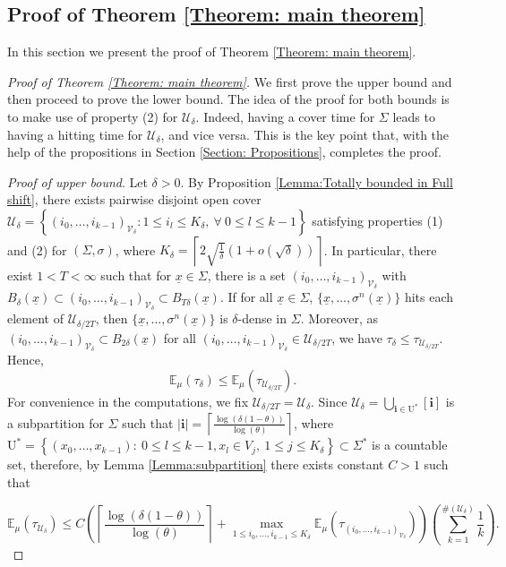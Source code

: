 \documentclass[11pt, reqno]{amsart}
\theoremstyle{plain}%
\theoremstyle{definition}
\theoremstyle{definition}
\def\U{\ensuremath{\mathcal U}}
\def\E{\mathbb E}
\def\st{such that }
\def\ulx{\underline{x}}
\numberwithin{equation}{section}
\begin{document}
\subsection{Proof of Theorem \ref{Theorem: main theorem}} In this section we present the proof of Theorem \ref{Theorem: main theorem}.
\begin{proof}[ Proof of Theorem \ref{Theorem: main theorem}] We first prove the upper bound and then proceed to prove the lower bound. The idea of the proof for both bounds is to make use of property (2) for $\U_\delta$. Indeed, having a cover time for $\Sigma$ leads to having a hitting time for $\U_\delta$, and vice versa. This is the key point that, with the help of the propositions in Section \ref{Section: Propositions}, completes the proof.


\textit{ Proof of upper bound}. Let $\delta>0$. By Proposition \ref{Lemma:Totally bounded in Full shift}, there exists pairwise disjoint open cover $\U_{\delta}=\left\{(i_0,\ldots,i_{k-1})_{\mathcal{V}_\delta}: 1\le i_l\le K_{\delta}, \ \forall \ 0\le l\le k-1 \right\}$ satisfying properties (1) and (2) for $(\Sigma,\sigma)$, where $K_{\delta}=\left\lceil2\sqrt{\frac{1}{\delta}}\left(1+o\left(\sqrt{\delta}\right)\right)\right\rceil$. In particular, there exist $1<T<\infty$ \st for $\ulx\in\Sigma$, there is a set $(i_0,\ldots,i_{k-1})_{\mathcal{V}_\delta}$ with $B_{\delta}(\ulx)\subset (i_0,\ldots,i_{k-1})_{\mathcal{V}_\delta}\subset B_{T\delta}(\ulx)$. If for all $\ulx\in \Sigma$, $\{\ulx,\ldots,\sigma^n(\ulx)\}$ hits each element of $\U_{\delta/2T}$, then $\{\ulx,\ldots,\sigma^n(\ulx)\}$ is $\delta$-dense in $\Sigma$. Moreover, as $(i_0,\ldots,i_{k-1})_{\mathcal{V}_\delta}\subset B_{2\delta}(\ulx)$ for all $(i_0,\ldots,i_{k-1})_{\mathcal{V}_\delta}\in \U_{\delta/2T}$, we have $\tau_\delta\le \tau_{\U_{\delta/2T}}$. Hence, $$\E_\mu(\tau_\delta)\le \E_\mu(\tau_{\U_{\delta/2T}}).$$ 
For convenience in the computations, we fix $\U_{\delta/2T}=\U_{\delta}$. Since $\U_{\delta}=\bigcup_{\mathbf{i}\in \mathrm{U}^*}[\mathbf{i}]$ is a subpartition for $\Sigma$ \st $|\textbf{i}|= \left\lceil\frac{\log(\delta(1-\theta))}{\log(\theta)}\right\rceil$, where $ \mathrm{U}^*=\left\{(x_0,\ldots,x_{k-1}): \ 0\le l\le k-1, x_l\in V_j, \ 1\le j\le K_\delta\right\}\subset \Sigma^*$ is a countable set, therefore, by Lemma \ref{Lemma:subpartition} there exists constant $C>1$ \st 

  $$ \E_\mu(\tau_\mathcal{U_\delta})\le C\left(\left\lceil\frac{\log(\delta(1-\theta))}{\log(\theta)}\right\rceil+\max_{1\le i_0,\ldots,i_{k-1}\le K_{\delta}}\E_\mu\left(\tau_{(i_0,\ldots,i_{k-1})_{\mathcal{V}_\delta}}\right)\right)\left( \sum_{k=1}^{\#(\U_{\delta})}\frac{1}{k}\right).$$


\end{proof}
\end{document}
